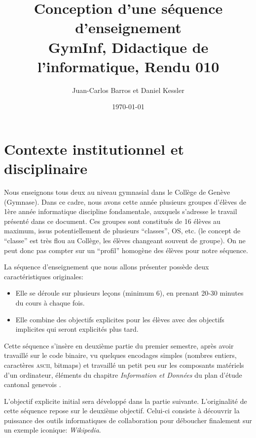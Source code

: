 \documentclass[11pt,bibliography=totoc]{scrartcl}
\author{Juan-Carlos Barros et Daniel Kessler}
\date{\today}
\title{Conception d'une séquence d'enseignement\\\medskip
  \large GymInf, Didactique de l'informatique, Rendu 010}
\newcommand\ajout[1]{{\color{blue} #1}}
\begin{document}
\thispagestyle{plain}  %

\maketitle
\tableofcontents  %
\pagebreak

\section{Contexte institutionnel et disciplinaire}
Nous enseignons tous deux au niveau gymnasial dans le Collège de Genève
(Gymnase). Dans ce cadre, nous avons cette année plusieurs groupes d'élèves de
1ère année informatique discipline fondamentale, auxquels s'adresse le travail
présenté dans ce document. Ces groupes sont constitués de 16 élèves au maximum,
issus potentiellement de plusieurs ``classes'', OS, etc.  (le concept de
``classe'' est très flou au Collège, les élèves changeant souvent de groupe).
\ajout {On ne peut donc pas compter sur un ``profil'' homogène des élèves pour notre séquence.}

La séquence d'enseignement que nous allons présenter possède deux
caractéristiques originales:
\begin{itemize}
\item Elle se déroule sur plusieurs leçons (minimum  6), en prenant 20-30 minutes du cours à
  chaque fois.
\item Elle combine des objectifs explicites pour les élèves avec des objectifs
  implicites qui seront explicités plus tard.
\end{itemize}

Cette séquence s'insère en deuxième partie du premier semestre, après avoir
travaillé sur le code binaire, vu quelques encodages simples (nombres entiers,
caractères \textsc{ascii}, bitmaps) et travaillé un petit peu sur les composants
matériels d'un ordinateur, éléments du chapitre \textit{Information et Données}
du plan d'étude cantonal genevois \autocite{pecinfo}.

L'objectif explicite initial sera développé dans la partie
suivante. L'originalité de cette séquence repose sur le deuxième
objectif. Celui-ci consiste à découvrir la puissance des outils informatiques de
collaboration pour déboucher finalement sur un exemple iconique:
\textit{Wikipedia}.
\end{document}
